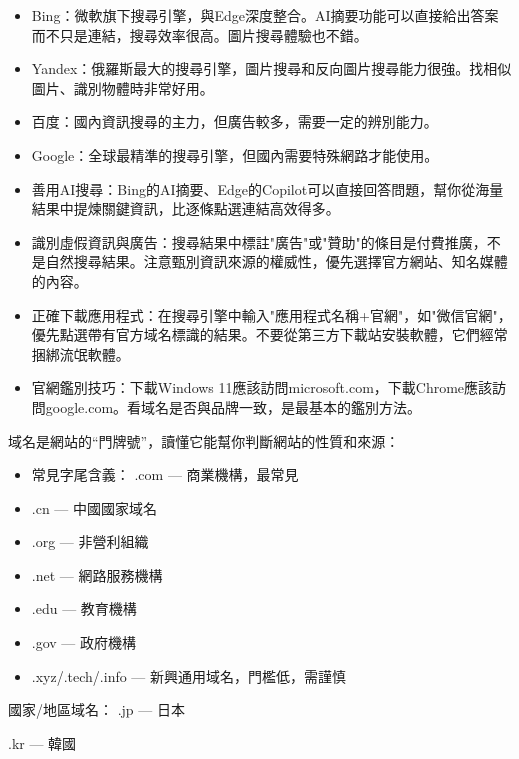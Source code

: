 
\begin{itemize}
  \item Bing：微軟旗下搜尋引擎，與Edge深度整合。AI摘要功能可以直接給出答案而不只是連結，搜尋效率很高。圖片搜尋體驗也不錯。
  \item Yandex：俄羅斯最大的搜尋引擎，圖片搜尋和反向圖片搜尋能力很強。找相似圖片、識別物體時非常好用。
  \item 百度：國內資訊搜尋的主力，但廣告較多，需要一定的辨別能力。
  \item Google：全球最精準的搜尋引擎，但國內需要特殊網路才能使用。
\end{itemize}


\begin{itemize}
  \item 善用AI搜尋：Bing的AI摘要、Edge的Copilot可以直接回答問題，幫你從海量結果中提煉關鍵資訊，比逐條點選連結高效得多。
  \item 識別虛假資訊與廣告：搜尋結果中標註"廣告"或"贊助"的條目是付費推廣，不是自然搜尋結果。注意甄別資訊來源的權威性，優先選擇官方網站、知名媒體的內容。
  \item 正確下載應用程式：在搜尋引擎中輸入"應用程式名稱+官網"，如"微信官網"，優先點選帶有官方域名標識的結果。不要從第三方下載站安裝軟體，它們經常捆綁流氓軟體。
  \item 官網鑑別技巧：下載Windows 11應該訪問microsoft.com，下載Chrome應該訪問google.com。看域名是否與品牌一致，是最基本的鑑別方法。
\end{itemize}


域名是網站的“門牌號”，讀懂它能幫你判斷網站的性質和來源：

\begin{itemize}
  \item 常見字尾含義： .com — 商業機構，最常見
  \item .cn — 中國國家域名
  \item .org — 非營利組織
  \item .net — 網路服務機構
  \item .edu — 教育機構
  \item .gov — 政府機構
  \item .xyz/.tech/.info — 新興通用域名，門檻低，需謹慎
\end{itemize}

國家/地區域名： .jp — 日本

.kr — 韓國

